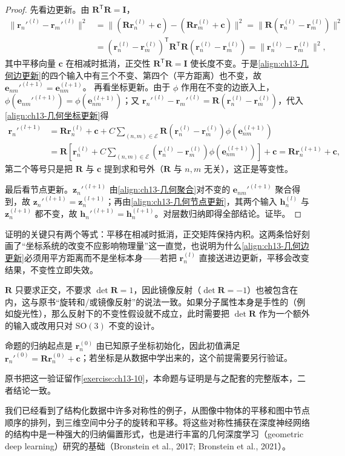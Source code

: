 \documentclass[../../main.tex]{subfiles}
\begin{document}
\begin{proof}
先看边更新。由 $\bm{R}^{\mathsf T}\bm{R}=\bm{I}$，
\begin{align*}
\|\bm{r}_n'^{(l)}-\bm{r}_m'^{(l)}\|^2&=\|(\bm{R}\bm{r}_n^{(l)}+\bm{c})-(\bm{R}\bm{r}_m^{(l)}+\bm{c})\|^2=\|\bm{R}(\bm{r}_n^{(l)}-\bm{r}_m^{(l)})\|^2\\
&=(\bm{r}_n^{(l)}-\bm{r}_m^{(l)})^{\mathsf T}\bm{R}^{\mathsf T}\bm{R}(\bm{r}_n^{(l)}-\bm{r}_m^{(l)})=\|\bm{r}_n^{(l)}-\bm{r}_m^{(l)}\|^2,
\end{align*}
其中平移向量 $\bm{c}$ 在相减时抵消，正交性 $\bm{R}^{\mathsf T}\bm{R}=\bm{I}$ 使长度不变。于是\eqref{align:ch13-几何边更新}的四个输入中有三个不变、第四个（平方距离）也不变，故 $\bm{e}_{nm}'^{(l+1)}=\bm{e}_{nm}^{(l+1)}$。
再看坐标更新。由于 $\phi$ 作用在不变的边嵌入上，$\phi(\bm{e}_{nm}'^{(l+1)})=\phi(\bm{e}_{nm}^{(l+1)})$；又 $\bm{r}_n'^{(l)}-\bm{r}_m'^{(l)}=\bm{R}(\bm{r}_n^{(l)}-\bm{r}_m^{(l)})$，代入\eqref{align:ch13-几何坐标更新}得
\begin{align*}
\bm{r}_n'^{(l+1)}&=\bm{R}\bm{r}_n^{(l)}+\bm{c}+C\sum_{(n,m)\in\mathcal{E}}\bm{R}\left(\bm{r}_n^{(l)}-\bm{r}_m^{(l)}\right)\phi\!\left(\bm{e}_{nm}^{(l+1)}\right)\\
&=\bm{R}\left[\bm{r}_n^{(l)}+C\sum_{(n,m)\in\mathcal{E}}\left(\bm{r}_n^{(l)}-\bm{r}_m^{(l)}\right)\phi\!\left(\bm{e}_{nm}^{(l+1)}\right)\right]+\bm{c}=\bm{R}\bm{r}_n^{(l+1)}+\bm{c},
\end{align*}
第二个等号只是把 $\bm{R}$ 与 $\bm{c}$ 提到求和号外（$\bm{R}$ 与 $n,m$ 无关），这正是等变性。\par
最后看节点更新。$\bm{z}_n'^{(l+1)}$ 由\eqref{align:ch13-几何聚合}对不变的 $\bm{e}_{nm}'^{(l+1)}$ 聚合得到，故 $\bm{z}_n'^{(l+1)}=\bm{z}_n^{(l+1)}$；再由\eqref{align:ch13-几何节点更新}，其两个输入 $\bm{h}_n^{(l)}$ 与 $\bm{z}_n^{(l+1)}$ 都不变，故 $\bm{h}_n'^{(l+1)}=\bm{h}_n^{(l+1)}$。对层数归纳即得全部结论。证毕。
\end{proof}

\begin{remark}
证明的关键只有两个等式：平移在相减时抵消，正交矩阵保持内积。这两条恰好刻画了“坐标系统的改变不应影响物理量”这一直觉，也说明为什么\eqref{align:ch13-几何边更新}必须用平方距离而不是坐标本身——若把 $\bm{r}_n^{(l)}$ 直接送进边更新，平移会改变结果，不变性立即失效。\par
$\bm{R}$ 只要求正交，不要求 $\det\bm{R}=1$，因此镜像反射（$\det\bm{R}=-1$）也被包含在内，这与原书“旋转和/或镜像反射”的说法一致。如果分子属性本身是手性的（例如旋光性），那么反射下的不变性假设就不成立，此时需要把 $\det\bm{R}$ 作为一个额外的输入或改用只对 $\mathrm{SO}(3)$ 不变的设计。\par
命题的归纳起点是 $\bm{r}_n^{(0)}$ 由已知原子坐标初始化，因此初值满足 $\bm{r}_n'^{(0)}=\bm{R}\bm{r}_n^{(0)}+\bm{c}$；若坐标是从数据中学出来的，这个前提需要另行验证。\par
原书把这一验证留作\cref{exercise:ch13-10}，本命题与证明是与之配套的完整版本，二者结论一致。
\end{remark}

我们已经看到了结构化数据中许多对称性的例子，从图像中物体的平移和图中节点顺序的排列，到三维空间中分子的旋转和平移。将这些对称性捕获在深度神经网络的结构中是一种强大的归纳偏置形式，也是进行丰富的几何深度学习（geometric deep learning）研究的基础（Bronstein et al., 2017; Bronstein et al., 2021）。
\end{document}
